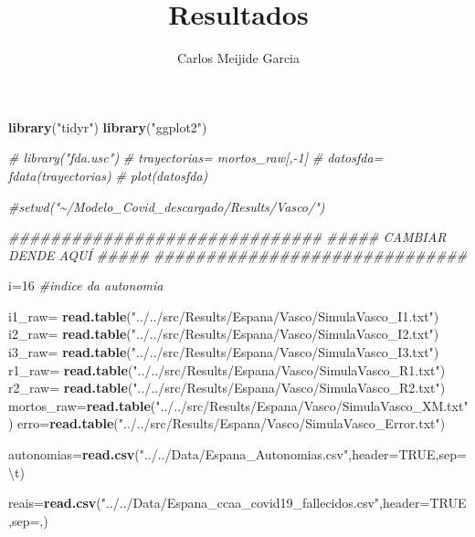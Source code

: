 \documentclass[
]{article}
\title{Resultados}
\author{Carlos Meijide Garcia}
\date{}
\newenvironment{Shaded}{\begin{snugshade}}{\end{snugshade}}
\newcommand{\CharTok}[1]{\textcolor[rgb]{0.31,0.60,0.02}{#1}}
\newcommand{\CommentTok}[1]{\textcolor[rgb]{0.56,0.35,0.01}{\textit{#1}}}
\newcommand{\DataTypeTok}[1]{\textcolor[rgb]{0.13,0.29,0.53}{#1}}
\newcommand{\DecValTok}[1]{\textcolor[rgb]{0.00,0.00,0.81}{#1}}
\newcommand{\KeywordTok}[1]{\textcolor[rgb]{0.13,0.29,0.53}{\textbf{#1}}}
\newcommand{\NormalTok}[1]{#1}
\newcommand{\OtherTok}[1]{\textcolor[rgb]{0.56,0.35,0.01}{#1}}
\newcommand{\StringTok}[1]{\textcolor[rgb]{0.31,0.60,0.02}{#1}}
\begin{document}
\maketitle

\begin{Shaded}
\begin{Highlighting}[]
\KeywordTok{library}\NormalTok{(}\StringTok{"tidyr"}\NormalTok{)}
\KeywordTok{library}\NormalTok{(}\StringTok{"ggplot2"}\NormalTok{)}

\CommentTok{\# library("fda.usc")}
\CommentTok{\# trayectorias= mortos\_raw[,{-}1]}
\CommentTok{\# datosfda= fdata(trayectorias)}
\CommentTok{\# plot(datosfda)}

\CommentTok{\#setwd("\textasciitilde{}/Modelo\_Covid\_descargado/Results/Vasco/")}

\CommentTok{\#\#\#\#\#\#\#\#\#\#\#\#\#\#\#\#\#\#\#\#\#\#\#\#\#\#\#\#\#\#}
\CommentTok{\#\#\#\#\# CAMBIAR DENDE AQUÍ \#\#\#\#\#}
\CommentTok{\#\#\#\#\#\#\#\#\#\#\#\#\#\#\#\#\#\#\#\#\#\#\#\#\#\#\#\#\#\#}

\NormalTok{i=}\DecValTok{16} \CommentTok{\#indice da autonomia}

\NormalTok{i1\_raw=}\StringTok{ }\KeywordTok{read.table}\NormalTok{(}\StringTok{"../../src/Results/Espana/Vasco/SimulaVasco\_I1.txt"}\NormalTok{)}
\NormalTok{i2\_raw=}\StringTok{ }\KeywordTok{read.table}\NormalTok{(}\StringTok{"../../src/Results/Espana/Vasco/SimulaVasco\_I2.txt"}\NormalTok{)}
\NormalTok{i3\_raw=}\StringTok{ }\KeywordTok{read.table}\NormalTok{(}\StringTok{"../../src/Results/Espana/Vasco/SimulaVasco\_I3.txt"}\NormalTok{)}
\NormalTok{r1\_raw=}\StringTok{ }\KeywordTok{read.table}\NormalTok{(}\StringTok{"../../src/Results/Espana/Vasco/SimulaVasco\_R1.txt"}\NormalTok{)}
\NormalTok{r2\_raw=}\StringTok{ }\KeywordTok{read.table}\NormalTok{(}\StringTok{"../../src/Results/Espana/Vasco/SimulaVasco\_R2.txt"}\NormalTok{)}
\NormalTok{mortos\_raw=}\KeywordTok{read.table}\NormalTok{(}\StringTok{"../../src/Results/Espana/Vasco/SimulaVasco\_XM.txt"}\NormalTok{)}
\NormalTok{erro=}\KeywordTok{read.table}\NormalTok{(}\StringTok{"../../src/Results/Espana/Vasco/SimulaVasco\_Error.txt"}\NormalTok{)}

\NormalTok{autonomias=}\KeywordTok{read.csv}\NormalTok{(}\StringTok{"../../Data/Espana\_Autonomias.csv"}\NormalTok{,}\DataTypeTok{header=}\OtherTok{TRUE}\NormalTok{,}\DataTypeTok{sep=}\StringTok{\textquotesingle{}}\CharTok{\textbackslash{}t}\StringTok{\textquotesingle{}}\NormalTok{)}

\NormalTok{reais=}\KeywordTok{read.csv}\NormalTok{(}\StringTok{"../../Data/Espana\_ccaa\_covid19\_fallecidos.csv"}\NormalTok{,}\DataTypeTok{header=}\OtherTok{TRUE}\NormalTok{,}\DataTypeTok{sep=}\StringTok{\textquotesingle{},\textquotesingle{}}\NormalTok{)}


\end{Highlighting}
\end{Shaded}
\end{document}

